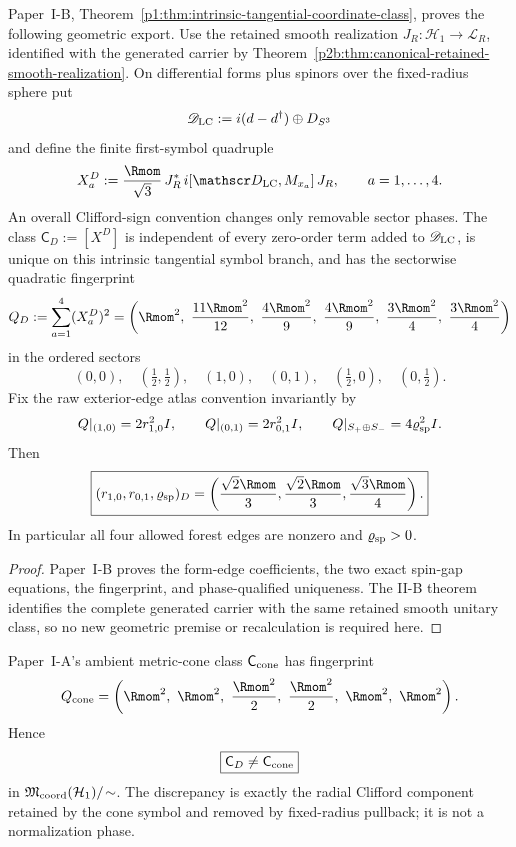 \documentclass[12pt,a4paper]{article}
\begin{document}
\begin{theorem}
\label{p2c:thm:intrinsic-tangential-coordinate-class}
Paper~I-B, Theorem~\ref{p1:thm:intrinsic-tangential-coordinate-class}, proves
the following geometric export.  Use the retained smooth realization
\(J_R:\mathcal H_1\to\mathcal L_R\), identified with the generated carrier by
Theorem~\ref{p2b:thm:canonical-retained-smooth-realization}.  On differential
forms plus spinors over the fixed-radius sphere put
\[
 \mathscr D_{\rm LC}:=i(d-d^\dagger)\oplus D_{S^3}
\]
and define the finite first-symbol quadruple
\[
 X_a^D:=\frac{\Rmom}{\sqrt3}\,
 J_R^*\,i[\mathscr D_{\rm LC},M_{x_a}]\,J_R,
 \qquad a=1,\ldots,4.
\]
An overall Clifford-sign convention changes only removable sector phases.
The class \(\mathsf C_D:=[X^D]\) is independent of every zero-order term
added to \(\mathscr D_{\rm LC}\), is unique on this intrinsic tangential
symbol branch, and has the sectorwise quadratic fingerprint
\[
 Q_D:=\sum_{a=1}^4(X_a^D)^2
 =\left(
 \Rmom^2,\ \frac{11\Rmom^2}{12},\
 \frac{4\Rmom^2}{9},\ \frac{4\Rmom^2}{9},\
 \frac{3\Rmom^2}{4},\ \frac{3\Rmom^2}{4}
 \right)
\]
in the ordered sectors
\[
 (0,0),\quad(\tfrac12,\tfrac12),\quad(1,0),\quad(0,1),
 \quad(\tfrac12,0),\quad(0,\tfrac12).
\]
Fix the raw exterior-edge atlas convention invariantly by
\[
 Q|_{(1,0)}=2r_{1,0}^2I,\qquad
 Q|_{(0,1)}=2r_{0,1}^2I,\qquad
 Q|_{S_+\oplus S_-}=4\varrho_{\rm sp}^2I.
\]
Then
\[
 \boxed{
 (r_{1,0},r_{0,1},\varrho_{\rm sp})_D
 =\left(\frac{\sqrt2\Rmom}{3},
        \frac{\sqrt2\Rmom}{3},
        \frac{\sqrt3\Rmom}{4}\right).}
\]
In particular all four allowed forest edges are nonzero and
\(\varrho_{\rm sp}>0\).
\end{theorem}

\begin{proof}
Paper~I-B proves the form-edge coefficients, the two exact spin-gap equations,
the fingerprint, and phase-qualified uniqueness.  The II-B theorem identifies
the complete generated carrier with the same retained smooth unitary class,
so no new geometric premise or recalculation is required here.
\end{proof}

\begin{corollary}
\label{p2c:cor:cone-tangential-coordinate-inequivalence}
Paper~I-A's ambient metric-cone class \(\mathsf C_{\rm cone}\) has fingerprint
\[
 Q_{\rm cone}=\left(
 \Rmom^2,\ \Rmom^2,\ \frac{\Rmom^2}{2},\
 \frac{\Rmom^2}{2},\ \Rmom^2,\ \Rmom^2\right).
\]
Hence
\[
 \boxed{\mathsf C_D\ne\mathsf C_{\rm cone}}
\]
in \(\mathfrak M_{\rm coord}(\mathcal H_1)/\!\sim\).  The discrepancy is
exactly the radial Clifford component retained by the cone symbol and removed
by fixed-radius pullback; it is not a normalization phase.
\end{corollary}
\end{document}
